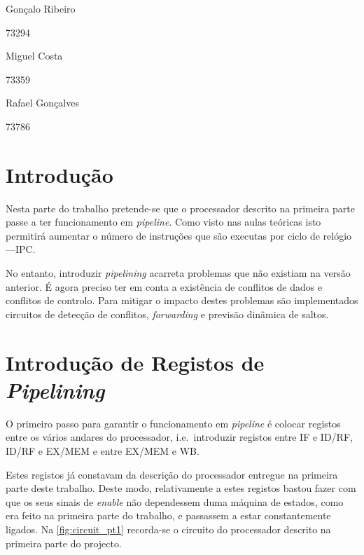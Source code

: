 \documentclass[a4paper]{article}
\begin{document}
	
	
	
	\trSetAuthors
		{
		Gonçalo Ribeiro
		
		73294
		}{
		Miguel Costa
		
		73359
		}{
		Rafael Gonçalves
		
		73786
		}
		
	
	\trMakeCover
	
	\tableofcontents
	\pagebreak
	
	\section{Introdução}
	
	Nesta parte do trabalho pretende-se que o processador descrito na primeira parte passe a ter funcionamento em \textit{pipeline}. Como visto nas aulas teóricas isto permitirá aumentar o número de instruções que são executas por ciclo de relógio---IPC.
	
	No entanto, introduzir \textit{pipelining} acarreta problemas que não existiam na versão anterior. É agora preciso ter em conta a existência de conflitos de dados e conflitos de controlo. Para mitigar o impacto destes problemas são implementados circuitos de detecção de conflitos, \textit{forwarding} e previsão dinâmica de saltos.
	
	
	\section{Introdução de Registos de \textit{Pipelining}}
	
	O primeiro passo para garantir o funcionamento em \textit{pipeline} é colocar registos entre os vários andares do processador, i.e.\ introduzir registos entre IF e ID/RF, ID/RF e EX/MEM e entre EX/MEM e WB.
	
	Estes registos já constavam da descrição do processador entregue na primeira parte deste trabalho. Deste modo, relativamente a estes registos bastou fazer com que os seus sinais de \textit{enable} não dependessem duma máquina de estados, como era feito na primeira parte do trabalho, e passassem a estar constantemente ligados. Na \autoref{fig:circuit_pt1} recorda-se o circuito do processador descrito na primeira parte do projecto.
	
\end{document}
